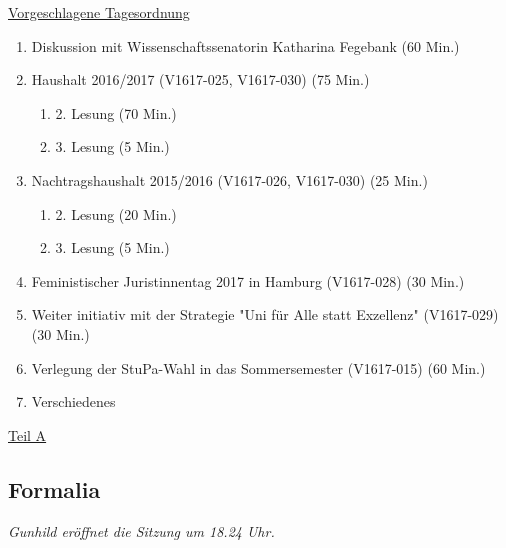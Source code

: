 \documentclass[ngerman,headheight=70pt]{scrartcl}
\begin{document}
    \newpage
    \underline{Vorgeschlagene Tagesordnung}
    \begin{enumerate}[label={\textbf{Top \theenumi}},leftmargin=*]
        \item Diskussion mit Wissenschaftssenatorin Katharina Fegebank (60 Min.)
        \item Haushalt 2016/2017 (V1617-025, V1617-030) (75 Min.)
        \begin{enumerate}
            \item 2. Lesung (70 Min.)
            \item 3. Lesung (5 Min.)
        \end{enumerate}
        \item Nachtragshaushalt 2015/2016 (V1617-026, V1617-030) (25 Min.)
        \begin{enumerate}
            \item 2. Lesung (20 Min.)
            \item 3. Lesung (5 Min.)
        \end{enumerate}
        \item Feministischer Juristinnentag 2017 in Hamburg (V1617-028) (30 Min.)
        \item Weiter initiativ mit der Strategie "Uni für Alle statt Exzellenz" (V1617-029) (30 Min.)
        \item Verlegung der StuPa-Wahl in das Sommersemester (V1617-015) (60 Min.)
        \item Verschiedenes
    \end{enumerate}

    \newpage


    {\Large \underline{Teil A}}

    \subsection{Formalia}

    \textit{Gunhild eröffnet die Sitzung um 18.24 Uhr.}
\end{document}
